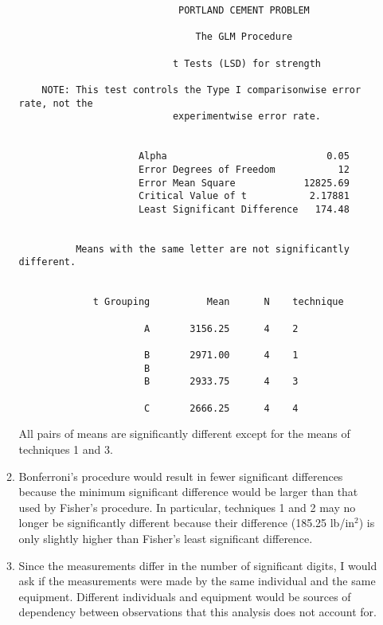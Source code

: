 \documentclass[11pt]{article}
\begin{document}
\begin{enumerate}
\begin{enumerate}
\begin{verbatim}
                            PORTLAND CEMENT PROBLEM

                               The GLM Procedure
 
                           t Tests (LSD) for strength

    NOTE: This test controls the Type I comparisonwise error rate, not the 
                           experimentwise error rate.


                     Alpha                            0.05
                     Error Degrees of Freedom           12
                     Error Mean Square            12825.69
                     Critical Value of t           2.17881
                     Least Significant Difference   174.48


          Means with the same letter are not significantly different.
 
 
             t Grouping          Mean      N    technique

                      A       3156.25      4    2        
                                                         
                      B       2971.00      4    1        
                      B                                  
                      B       2933.75      4    3        
                                                         
                      C       2666.25      4    4        
\end{verbatim}

All pairs of means are significantly different except for the means of
techniques 1 and 3.

\item %
Bonferroni's procedure would result in fewer significant differences
because the minimum significant difference would be larger than that
used by Fisher's procedure. In particular, techniques 1 and 2 may
no longer be significantly different because their difference
(185.25 lb/in\(^2\)) is only slightly higher than Fisher's least
significant difference.

\item %
Since the measurements differ in the number of significant digits,
I would ask if the measurements were made by the same individual and
the same equipment. Different individuals and equipment would be
sources of dependency between observations that this analysis does not
account for.

\end{enumerate}


\end{enumerate}
\end{document}
